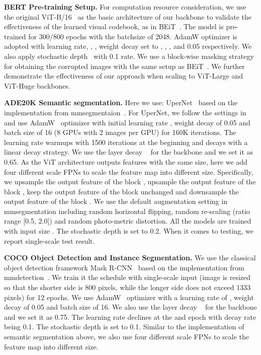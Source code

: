 \documentclass[letterpaper]{article} \usepackage{aaai23}  \usepackage{times}  \usepackage{helvet}  \usepackage{courier}  \usepackage[hyphens]{url}  \usepackage{graphicx} \urlstyle{rm} \def\UrlFont{\rm}  \usepackage{natbib}  \usepackage{caption} \frenchspacing  \setlength{\pdfpagewidth}{8.5in}  \setlength{\pdfpageheight}{11in}  \usepackage{algorithm}
\begin{document}
\noindent \textbf{BERT Pre-training Setup.} 
For computation resource consideration, we use the original ViT-B/16~\cite{dosovitskiy2020image} as the basic architecture of our backbone to validate the effectiveness of the learned visual codebook, as in BEiT~\cite{bao2021beit}. The model is pre-trained for 300/800 epochs with the batchsize of 2048. 
AdamW optimizer is adopted with learning rate, , , weight decay set to , , , and 0.05 respectively. We also apply stochastic depth~\cite{huang2016deep} with 0.1 rate.
We use a block-wise masking strategy for obtaining the corrupted images with the same setup as BEiT~\cite{bao2021beit}. 
We further demonstrate the effectiveness of our approach when scaling to ViT-Large and ViT-Huge backbones.

\noindent \textbf{ADE20K Semantic segmentation.}
Here we use: UperNet~\cite{xiao2018unified} based on the implementation from mmsegmentaion~\cite{mmseg2020}. 
For UperNet, we follow the settings in ~\cite{bao2021beit} and use AdamW~\cite{loshchilov2017decoupled} optimizer with initial learning rate , weight decay of 0.05 and batch size of 16 (8 GPUs with 2 images per GPU) for 160K iterations. The learning rate warmups with 1500 iterations at the beginning and decays with a linear decay strategy. We use the layer decay ~\cite{bao2021beit} for the backbone and we set it as 0.65. 
As the ViT architecture outputs features with the same size, here we add four different scale FPNs to scale the feature map into different size. Specifically, we upsample the output feature of the  block , upsample the output feature of the  block , keep the output feature of the  block unchanged and downsample the output feature of the  block . 
We use the default augmentation setting in mmsegmentation including random horizontal flipping, random re-scaling (ratio range [0.5, 2.0]) and random photo-metric distortion. All the models are trained with input size . The stochastic depth is set to 0.2. When it comes to testing, we report single-scale test result.


\noindent \textbf{COCO Object Detection and Instance Segmentation.}
We use the classical object detection framework Mask R-CNN~\cite{he2017mask} based on the implementation from mmdetection~\cite{mmdetection}. We train it the  schedule with single-scale input (image is resized so that the shorter side is 800 pixels, while the longer side does not exceed 1333 pixels) for 12 epochs. We use AdamW~\cite{loshchilov2017decoupled} optimizer with a learning rate of , weight decay of 0.05 and batch size of 16. We also use the layer decay ~\cite{bao2021beit} for the backbone and we set it as 0.75. 
The learning rate declines at the  and  epoch with decay rate being 0.1. The stochastic depth is set to 0.1. 
Similar to the implementation of semantic segmentation above, we also use four different scale FPNs to scale the feature map into different size.
\end{document}
